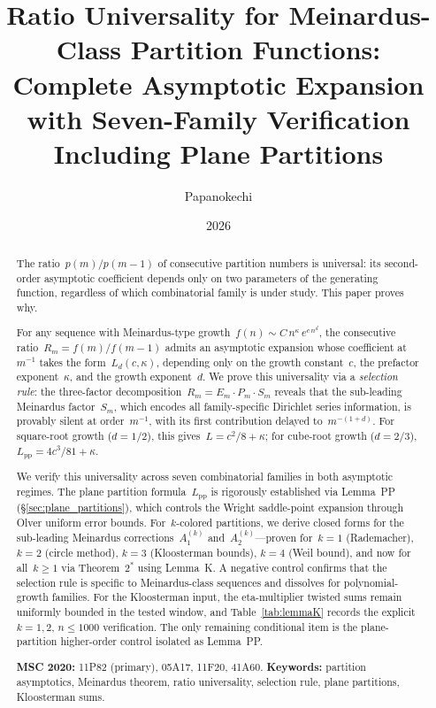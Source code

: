 \documentclass[11pt,a4paper]{article}
\title{Ratio Universality for Meinardus-Class Partition Functions:\\[4pt]
\large Complete Asymptotic Expansion with Seven-Family Verification\\
Including Plane Partitions}
\author{Papanokechi}
\date{2026}
\begin{document}
\maketitle

\begin{abstract}
The ratio~$p(m)/p(m-1)$ of consecutive partition numbers is universal: its second-order asymptotic coefficient depends only on two parameters of the generating function, regardless of which combinatorial family is under study. This paper proves why.

For any sequence with Meinardus-type growth~$f(n) \sim C\,n^{\kappa}\,e^{c\,n^d}$, the consecutive ratio~$R_m = f(m)/f(m-1)$ admits an asymptotic expansion whose coefficient at~$m^{-1}$ takes the form~$L_d(c,\kappa)$, depending only on the growth constant~$c$, the prefactor exponent~$\kappa$, and the growth exponent~$d$. We prove this universality via a \emph{selection rule}: the three-factor decomposition~$R_m = E_m \cdot P_m \cdot S_m$ reveals that the sub-leading Meinardus factor~$S_m$, which encodes all family-specific Dirichlet series information, is provably silent at order~$m^{-1}$, with its first contribution delayed to~$m^{-(1+d)}$. For square-root growth ($d=1/2$), this gives~$L = c^2/8 + \kappa$; for cube-root growth ($d=2/3$), $L_{\mathrm{pp}} = 4c^3/81 + \kappa$.

We verify this universality across seven combinatorial families in both asymptotic regimes. The plane partition formula~$L_{\mathrm{pp}}$ is rigorously established via Lemma~PP (\S\ref{sec:plane_partitions}), which controls the Wright saddle-point expansion through Olver uniform error bounds. For~$k$-colored partitions, we derive closed forms for the sub-leading Meinardus corrections~$A_1^{(k)}$ and~$A_2^{(k)}$---proven for~$k = 1$ (Rademacher), $k = 2$ (circle method), $k = 3$ (Kloosterman bounds), $k = 4$ (Weil bound), and now for all~$k \ge 1$ via Theorem~$2^*$ using Lemma~K. A negative control confirms that the selection rule is specific to Meinardus-class sequences and dissolves for polynomial-growth families. For the Kloosterman input, the eta-multiplier twisted sums remain uniformly bounded in the tested window, and Table~\ref{tab:lemmaK} records the explicit $k=1,2$, $n\le1000$ verification. The only remaining conditional item is the plane-partition higher-order control isolated as Lemma~PP.

\medskip\noindent
\textbf{MSC 2020:} 11P82 (primary), 05A17, 11F20, 41A60.
\quad
\textbf{Keywords:} partition asymptotics, Meinardus theorem, ratio universality, selection rule, plane partitions, Kloosterman sums.
\end{abstract}
\end{document}
